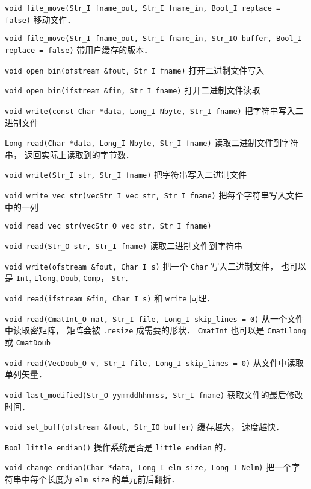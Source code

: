 \verb|void file_move(Str_I fname_out, Str_I fname_in, Bool_I replace = false)| 移动文件．

\verb|void file_move(Str_I fname_out, Str_I fname_in, Str_IO buffer, Bool_I replace = false)| 带用户缓存的版本．

\verb|void open_bin(ofstream &fout, Str_I fname)| 打开二进制文件写入

\verb|void open_bin(ifstream &fin, Str_I fname)| 打开二进制文件读取

\verb|void write(const Char *data, Long_I Nbyte, Str_I fname)| 把字符串写入二进制文件

\verb|Long read(Char *data, Long_I Nbyte, Str_I fname)| 读取二进制文件到字符串， 返回实际上读取到的字节数．

\verb|void write(Str_I str, Str_I fname)| 把字符串写入二进制文件

\verb|void write_vec_str(vecStr_I vec_str, Str_I fname)| 把每个字符串写入文件中的一列

\verb|void read_vec_str(vecStr_O vec_str, Str_I fname)|

\verb|void read(Str_O str, Str_I fname)| 读取二进制文件到字符串

\verb|void write(ofstream &fout, Char_I s)| 把一个 \verb|Char| 写入二进制文件， 也可以是 \verb|Int|, \verb|Llong|, \verb|Doub|, \verb|Comp|， \verb|Str|．

\verb|void read(ifstream &fin, Char_I s)| 和 \verb|write| 同理．

\verb|void read(CmatInt_O mat, Str_I file, Long_I skip_lines = 0)| 从一个文件中读取密矩阵， 矩阵会被 \verb|.resize| 成需要的形状． \verb|CmatInt| 也可以是 \verb|CmatLlong| 或 \verb|CmatDoub|

\verb|void read(VecDoub_O v, Str_I file, Long_I skip_lines = 0)| 从文件中读取单列矢量．

\verb|void last_modified(Str_O yymmddhhmmss, Str_I fname)| 获取文件的最后修改时间．

\verb|void set_buff(ofstream &fout, Str_IO buffer)| 缓存越大， 速度越快．

\verb|Bool little_endian()| 操作系统是否是 \verb|little_endian| 的．

\verb|void change_endian(Char *data, Long_I elm_size, Long_I Nelm)| 把一个字符串中每个长度为 \verb|elm_size| 的单元前后翻折．
